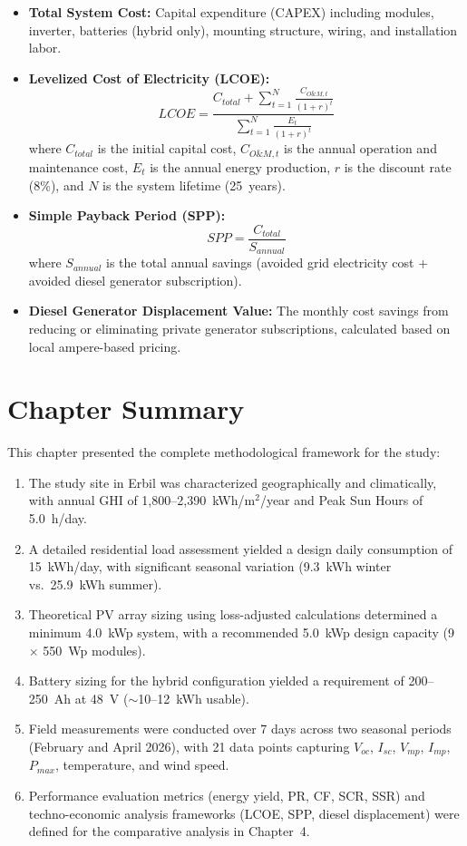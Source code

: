 \begin{itemize}
    \item \textbf{Total System Cost:} Capital expenditure (CAPEX) including modules, inverter, batteries (hybrid only), mounting structure, wiring, and installation labor.
    \item \textbf{Levelized Cost of Electricity (LCOE):}
    \begin{equation}
        LCOE = \frac{C_{total} + \sum_{t=1}^{N} \frac{C_{O\&M,t}}{(1+r)^t}}{\sum_{t=1}^{N} \frac{E_{t}}{(1+r)^t}}
        \label{eq:lcoe}
    \end{equation}
    where $C_{total}$ is the initial capital cost, $C_{O\&M,t}$ is the annual operation and maintenance cost, $E_t$ is the annual energy production, $r$ is the discount rate (8\%), and $N$ is the system lifetime (25~years).
    \item \textbf{Simple Payback Period (SPP):}
    \begin{equation}
        SPP = \frac{C_{total}}{S_{annual}}
        \label{eq:spp}
    \end{equation}
    where $S_{annual}$ is the total annual savings (avoided grid electricity cost + avoided diesel generator subscription).
    \item \textbf{Diesel Generator Displacement Value:} The monthly cost savings from reducing or eliminating private generator subscriptions, calculated based on local ampere-based pricing.
\end{itemize}


\section{Chapter Summary}

This chapter presented the complete methodological framework for the study:

\begin{enumerate}
    \item The study site in Erbil was characterized geographically and climatically, with annual GHI of 1,800--2,390~kWh/m$^{2}$/year and Peak Sun Hours of 5.0~h/day.
    \item A detailed residential load assessment yielded a design daily consumption of 15~kWh/day, with significant seasonal variation (9.3~kWh winter vs.\ 25.9~kWh summer).
    \item Theoretical PV array sizing using loss-adjusted calculations determined a minimum 4.0~kWp system, with a recommended 5.0~kWp design capacity (9 $\times$ 550~Wp modules).
    \item Battery sizing for the hybrid configuration yielded a requirement of 200--250~Ah at 48~V ($\sim$10--12~kWh usable).
    \item Field measurements were conducted over 7 days across two seasonal periods (February and April 2026), with 21 data points capturing $V_{oc}$, $I_{sc}$, $V_{mp}$, $I_{mp}$, $P_{max}$, temperature, and wind speed.
    \item Performance evaluation metrics (energy yield, PR, CF, SCR, SSR) and techno-economic analysis frameworks (LCOE, SPP, diesel displacement) were defined for the comparative analysis in Chapter~4.
\end{enumerate}
